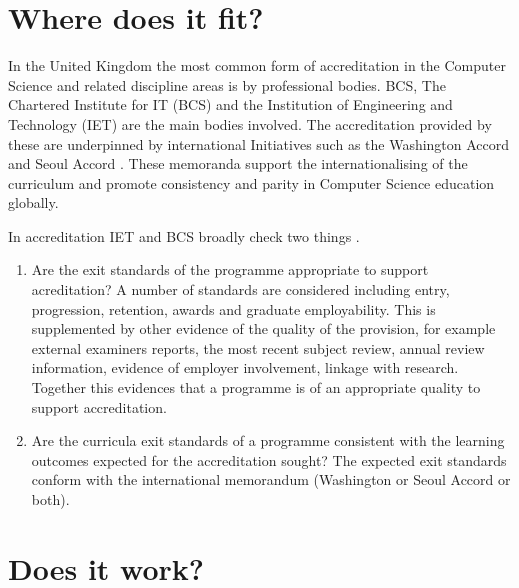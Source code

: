 \documentclass[sigconf]{acmart}
\begin{document}
\section {Where does it fit?	}

In the United Kingdom the most common form of accreditation in the Computer Science and related discipline areas is by professional bodies.  BCS, The Chartered Institute for IT (BCS) and the Institution of Engineering and Technology (IET) are the main bodies involved. The accreditation provided by these %
are underpinned by international Initiatives such as the Washington Accord \cite[for CEng]{Washington2019} and Seoul Accord \cite[for CITP]{Seoul2019}. These memoranda support the internationalising of the curriculum and promote consistency and parity in Computer Science education globally. 

In accreditation IET and BCS broadly check two things \cite{BCS2018a, IET2019}. 

\begin{enumerate}
    \item Are the exit standards of the programme appropriate to support acreditation?
     A number of standards are considered including entry, progression, retention, awards and graduate employability.  This is supplemented by other evidence of the quality of the provision, for example external examiners reports, the most recent subject review, annual review information, evidence of employer involvement, linkage with research. Together this evidences that a programme is of an appropriate quality to support accreditation.
    \item Are the curricula exit standards of a programme consistent with the learning outcomes expected for the accreditation sought? The expected exit standards conform with the international memorandum (Washington or Seoul Accord or both). 
\end{enumerate}

\section {Does it work?}
\end{document}
